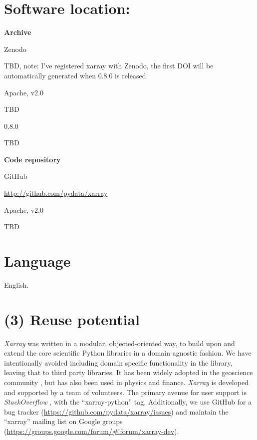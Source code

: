 \documentclass{jors}
\begin{document}
\section*{Software location:}

{\bf Archive}

\begin{description}[noitemsep,topsep=0pt]
	\item[Name:] Zenodo
	\item[Persistent identifier:] TBD, note: I've registered xarray with Zenodo, the first DOI will be automatically generated when 0.8.0 is released
	\item[Licence:] Apache, v2.0
	\item[Publisher:]  TBD
	\item[Version published:] 0.8.0
	\item[Date published:] TBD
\end{description}

{\bf Code repository}

\begin{description}[noitemsep,topsep=0pt]
	\item[Name:] GitHub
	\item[Persistent identifier:] \url{http://github.com/pydata/xarray}
	\item[Licence:] Apache, v2.0
	\item[Date published:] TBD
\end{description}

\section*{Language}

English.

\section*{(3) Reuse potential}

\textit{Xarray} was written in a modular, objected-oriented way, to build upon and extend the core scientific Python libraries in a domain agnostic fashion.
We have intentionally avoided including domain specific functionality in the library, leaving that to third party libraries.
It has been widely adopted in the geoscience community \citep[e.g.][]{Dawson_2016a,Dawson_2016b,xgcm}, but has also been used in physics \citep[e.g.][]{pycalphad} and finance.
\textit{Xarray} is developed and supported by a team of volunteers. The primary avenue for user support is \textit{StackOverflow} \citep{stackoverflow}, with the ``xarray-python'' tag.
Additionally, we use GitHub for a bug tracker (\url{https://github.com/pydata/xarray/issues}) and maintain the ``xarray'' mailing list on Google groups (\url{https://groups.google.com/forum/#!forum/xarray-dev}).
\end{document}
